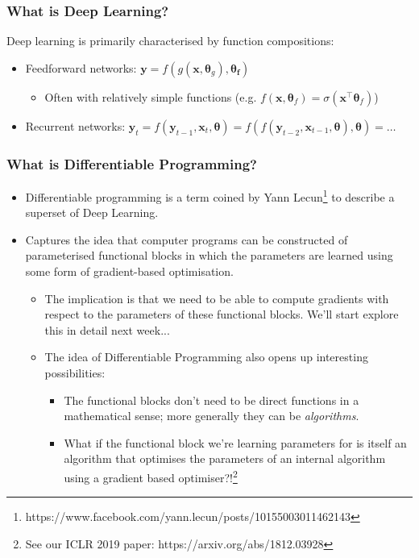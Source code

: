 \documentclass[\beamerclass]{beamer}
\begin{document}
\begin{frame}
\frametitle{What is Deep Learning?}

Deep learning is primarily characterised by function compositions: \\ \vspace{10mm}
\begin{itemize}
	\item<2-> Feedforward networks: $\bm{y} = f (g(\bm{x}, \bm\theta_g), \bm{\theta_f})$
	\begin{itemize}
		\item Often with relatively simple functions (e.g. $f(\bm x, \bm{\theta}_f) = \sigma(\bm{x}^\top \bm{\theta}_f)$)
	\end{itemize} \vspace{3mm}
	\item<3-> Recurrent networks: $\bm y_t = f(\bm y_{t-1}, \bm x_t, \bm\theta) = f(f(\bm y_{t-2}, \bm x_{t-1}, \bm\theta), \bm\theta) = \dots$
\end{itemize}
\vspace{10mm}


\end{frame}

\begin{frame}
\frametitle{What is Differentiable Programming?}
	
\begin{itemize}
	\item<+-> Differentiable programming is a term coined by Yann Lecun\footnote{https://www.facebook.com/yann.lecun/posts/10155003011462143} to describe a superset of Deep Learning.
	\item<+-> Captures the idea that computer programs can be constructed of parameterised functional blocks in which the parameters are learned using some form of gradient-based optimisation.
	\begin{itemize}
		\item<+-> The implication is that we need to be able to compute gradients with respect to the parameters of these functional blocks. We'll start explore this in detail next week...
		\item<+-> The idea of Differentiable Programming also opens up interesting possibilities: 
		\begin{itemize}
			\item The functional blocks don't need to be direct functions in a mathematical sense; more generally they can be \emph{algorithms}.
			\item What if the functional block we're learning parameters for is itself an algorithm that optimises the parameters of an internal algorithm using a gradient based optimiser?!\footnote{See our ICLR 2019 paper: https://arxiv.org/abs/1812.03928}
		\end{itemize}
	\end{itemize}
\end{itemize}
\end{frame}
\end{document}
